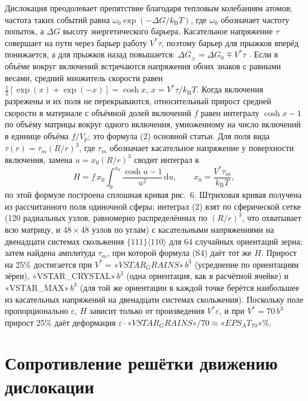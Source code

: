 \documentclass[11pt,a4paper]{article}
\begin{document}
Дислокация преодолевает препятствие благодаря тепловым колебаниям атомов;
частота таких событий равна $\omega_0\exp(-\Delta G/k_{\mathrm B}T)$, где
$\omega_0$ обозначает частоту попыток, а $\Delta G$ высоту энергетического
барьера. Касательное
напряжение $\tau$ совершает на пути через барьер работу $V^*\tau$, поэтому
барьер для прыжков вперёд понижается, а для прыжков назад повышается:
$\Delta G_\pm=\Delta G_0\mp V^*\tau$ \cite{KocksArgonAshby1975,CaillardMartin2003}.
Если в объёме вокруг включений встречаются напряжения обоих знаков
с равными весами, средний множитель скорости равен
$\tfrac12[\exp(x)+\exp(-x)]=\cosh x$, $x=V^*\tau/k_{\mathrm B}T$.
Когда включения разрежены и их поля не перекрываются, относительный
прирост средней скорости в материале с объёмной долей включений $f$ равен
интегралу $\cosh x-1$ по объёму матрицы вокруг одного включения,
умноженному на число включений в единице объёма $f/V_p$; это формула (2) основной статьи. Для поля вида $\tau(r)=\tau_m(R/r)^3$, где $\tau_m$ обозначает касательное
напряжение у поверхности включения, замена
$u=x_0(R/r)^3$ сводит интеграл к
\begin{equation}
H=f\,x_0\int_0^{x_0}\frac{\cosh u-1}{u^2}\,\mathrm du,\qquad
x_0=\frac{V^*\tau_m}{k_{\mathrm B}T},
\end{equation}
по этой формуле построена сплошная кривая рис.~6. Штриховая кривая
получена из рассчитанного поля одиночной сферы: интеграл (2) взят
по сферической сетке (120 радиальных узлов, равномерно распределённых по $(R/r)^3$, что
охватывает всю матрицу, и $48\times48$ узлов по углам) с касательными напряжениями на двенадцати системах скольжения
$\{111\}\langle110\rangle$ для 64 случайных ориентаций зерна; затем
найдена амплитуда $\tau_m$, при которой формула (S4) даёт тот же $H$.
Прирост на 25\% достигается при $V^*=«VSTAR_GRAINS»\,b^3$ (усреднение
по ориентациям зёрен), «VSTAR_CRYSTAL»$\,b^3$ (одна ориентация, как
в расчётной ячейке) и «VSTAR_MAX»$\,b^3$ (для той же ориентации в каждой
точке берётся наибольшее из касательных напряжений на двенадцати системах
скольжения).
Поскольку поле пропорционально $\varepsilon$, $H$ зависит только
от произведения $V^*\varepsilon$, и при $V^*=70\,b^3$ прирост 25\%
даёт деформация $\varepsilon\cdot«VSTAR_GRAINS»/70\approx«EPS_AT_70»\%$.

\section{Сопротивление решётки движению дислокации}
\end{document}
